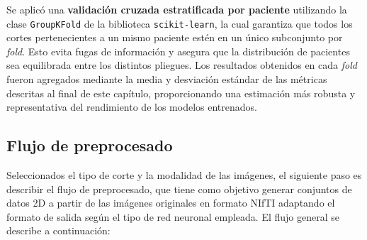 \documentclass[../main.tex]{subfiles}
\begin{document}
Se aplicó una \textbf{validación cruzada estratificada por paciente} utilizando la clase \texttt{GroupKFold} de la biblioteca \texttt{scikit-learn}, la cual garantiza que todos los cortes pertenecientes a un mismo paciente estén en un único subconjunto por \textit{fold}. Esto evita fugas de información y asegura que la distribución de pacientes sea equilibrada entre los distintos pliegues. Los resultados obtenidos en cada \textit{fold} fueron agregados mediante la media y desviación estándar de las métricas descritas al final de este capítulo, proporcionando una estimación más robusta y representativa del rendimiento de los modelos entrenados.


\subsection{Flujo de preprocesado}
Seleccionados el tipo de corte y la modalidad de las imágenes, el siguiente paso es describir el flujo de preprocesado, que tiene como objetivo generar conjuntos de datos 2D a partir de las imágenes originales en formato NIfTI adaptando el formato de salida según el tipo de red neuronal empleada. El flujo general se describe a continuación:
\end{document}
